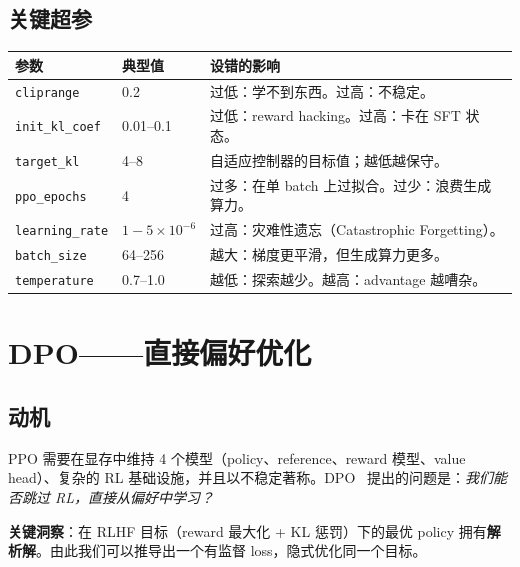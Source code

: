 \section{关键超参}
\label{critical-hyperparameters}

\begin{center}
\begin{tabularx}{0.92\linewidth}{@{}l l Z{1}@{}}
\toprule
\textbf{参数} & \textbf{典型值} & \textbf{设错的影响} \\
\midrule
\texttt{cliprange} & 0.2 & 过低：学不到东西。过高：不稳定。 \\
\texttt{init\_kl\_coef} & 0.01--0.1 & 过低：reward hacking。过高：卡在 SFT 状态。 \\
\texttt{target\_kl} & 4--8 & 自适应控制器的目标值；越低越保守。 \\
\texttt{ppo\_epochs} & 4 & 过多：在单 batch 上过拟合。过少：浪费生成算力。 \\
\texttt{learning\_rate} & $1{-}5 \times 10^{-6}$ & 过高：灾难性遗忘（Catastrophic Forgetting）。 \\
\texttt{batch\_size} & 64--256 & 越大：梯度更平滑，但生成算力更多。 \\
\texttt{temperature} & 0.7--1.0 & 越低：探索越少。越高：advantage 越嘈杂。 \\
\bottomrule
\end{tabularx}
\end{center}

\chapter{DPO——直接偏好优化}
\label{dpo-direct-preference-optimization}

\section{动机}
\label{motivation}

PPO 需要在显存中维持 4 个模型（policy、reference、reward 模型、value head）、复杂的 RL 基础设施，并且以不稳定著称。DPO~\cite{rafailov2023direct} 提出的问题是：\emph{我们能否跳过 RL，直接从偏好中学习？}

\textbf{关键洞察}：在 RLHF 目标（reward 最大化 + KL 惩罚）下的最优 policy 拥有\textbf{解析解}。由此我们可以推导出一个有监督 loss，隐式优化同一个目标。

